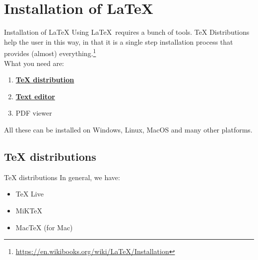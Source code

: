 \documentclass{beamer}
\begin{document}
\section{Installation of \LaTeX}
\begin{frame}{Installation of \LaTeX}
	Using \LaTeX\ requires a bunch of tools. TeX Distributions help the user in this way, in that it is a single step installation process that provides (almost) everything.\footnote{\href{https://en.wikibooks.org/wiki/LaTeX/Installation}{https://en.wikibooks.org/wiki/LaTeX/Installation}}\\
	What you need are:
	\begin{enumerate}
		\item \hyperlink{texdistros}{\textbf{TeX distribution}}
		\item \hyperlink{texteditors}{\textbf{Text editor}}
		\item PDF viewer
	\end{enumerate}
	All these can be installed on Windows, Linux, MacOS and many other platforms. \\
\end{frame}

\subsection{TeX distributions}\hypertarget{texdistros}{}
\begin{frame}{TeX distributions}
	In general, we have:
	\begin{itemize}

		\item TeX Live \\
		\href{https://www.tug.org/texlive/quickinstall.html}{}
		
		\item MiKTeX \\
		\href{https://miktex.org/download}{}
		
		\item MacTeX (for Mac) \\
		\href{https://www.tug.org/mactex/mactex-download.html}{}
	\end{itemize}
\end{frame}
\end{document}
